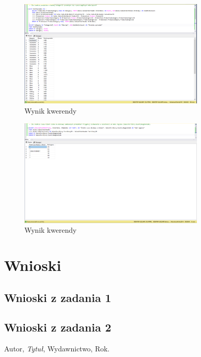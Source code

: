 \documentclass[a4paper,12pt]{article}
\begin{document}
\begin{figure}[H]
    \centering
    \includegraphics[width=0.8\textwidth]{images/09.png}
    \caption{Wynik kwerendy}
    \end{figure}

\begin{figure}[H]
    \centering
    \includegraphics[width=0.8\textwidth]{images/10.png}
    \caption{Wynik kwerendy}
    \end{figure}

\section{Wnioski}

\subsection{Wnioski z zadania 1}

\subsection{Wnioski z zadania 2}

\begin{thebibliography}{9}
Autor, \textit{Tytuł}, Wydawnictwo, Rok.
\end{thebibliography}
\end{document}
